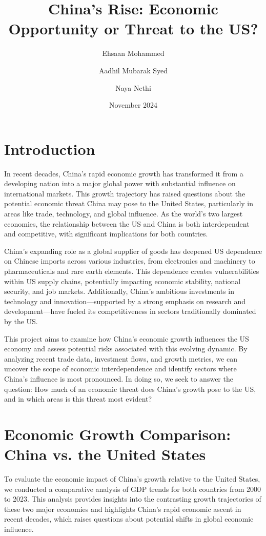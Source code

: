 \documentclass{article}
\title{China’s Rise: Economic Opportunity or Threat to the US?}
\author{
    Ehsaan Mohammed \and
    Aadhil Mubarak Syed \and
    Naya Nethi
}
\date{November 2024}
\begin{document}
\maketitle

\section{Introduction}

In recent decades, China’s rapid economic growth has transformed it from a developing nation into a major global power with substantial influence on international markets. This growth trajectory has raised questions about the potential economic threat China may pose to the United States, particularly in areas like trade, technology, and global influence. As the world’s two largest economies, the relationship between the US and China is both interdependent and competitive, with significant implications for both countries.

China’s expanding role as a global supplier of goods has deepened US dependence on Chinese imports across various industries, from electronics and machinery to pharmaceuticals and rare earth elements. This dependence creates vulnerabilities within US supply chains, potentially impacting economic stability, national security, and job markets. Additionally, China’s ambitious investments in technology and innovation—supported by a strong emphasis on research and development—have fueled its competitiveness in sectors traditionally dominated by the US.

This project aims to examine how China’s economic growth influences the US economy and assess potential risks associated with this evolving dynamic. By analyzing recent trade data, investment flows, and growth metrics, we can uncover the scope of economic interdependence and identify sectors where China's influence is most pronounced. In doing so, we seek to answer the question: How much of an economic threat does China’s growth pose to the US, and in which areas is this threat most evident?

\section{Economic Growth Comparison: China vs. the United States}

To evaluate the economic impact of China’s growth relative to the United States, we conducted a comparative analysis of GDP trends for both countries from 2000 to 2023. This analysis provides insights into the contrasting growth trajectories of these two major economies and highlights China’s rapid economic ascent in recent decades, which raises questions about potential shifts in global economic influence.
\end{document}
